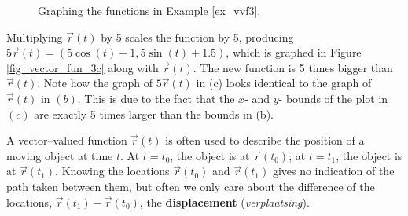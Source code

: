 \begin{example}
\begin{figure}[H]
\centering
\centerline{
\hspace{0.1cm}
\hspace{0.1cm}
}
\caption{Graphing the functions in Example \ref{ex_vvf3}.}
\end{figure}


Multiplying $\vec r(t)$ by 5 scales the function by 5, producing $5\vec r(t) =  \left( 5\cos (t)+1,5\sin (t)+1.5\right)$, which is graphed in Figure \ref{fig_vector_fun_3c} along with $\vec r(t)$. The new function is 5 times bigger than $\vec r(t)$. Note how the graph of $5\vec r(t)$ in (c) looks identical to the graph of $\vec r(t)$ in $(b)$. This is due to the fact that the $x$- and $y$- bounds of the plot in $(c)$ are exactly 5 times larger than the bounds in (b).
\end{example}


A vector--valued function $\vec r(t)$ is often used to describe the position of a moving object at time $t$. At $t=t_0$, the object is at $\vec r(t_0)$; at $t=t_1$, the object is at $\vec r(t_1)$. Knowing the locations $\vec r(t_0)$ and $\vec r(t_1)$ gives no indication of the path taken between them, but often we only care about the difference of the locations, $\vec r(t_1)-\vec r(t_0)$, the \textbf{displacement} (\textit{verplaatsing}).

